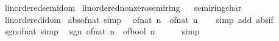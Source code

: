 \begin{isabellebody}
\isanewline
\isanewline
{}\isamarkupfalse%
\ linordered{\isacharunderscore}{\kern0pt}semidom\isanewline
{}\isanewline
\isanewline
{}\isamarkupfalse%
\ linordered{\isacharunderscore}{\kern0pt}nonzero{\isacharunderscore}{\kern0pt}semiring%
\isadelimproof
\ %
\endisadelimproof
%
\isatagproof
\isacommand{{\isachardot}{\kern0pt}{\isachardot}{\kern0pt}}\isamarkupfalse%
%
\endisatagproof
{\isafoldproof}%
%
\isadelimproof
%
\endisadelimproof
\isanewline
\isanewline
{}\isamarkupfalse%
\ semiring{\isacharunderscore}{\kern0pt}char{\isacharunderscore}{\kern0pt}{}%
\isadelimproof
\ %
\endisadelimproof
%
\isatagproof
\isacommand{{\isachardot}{\kern0pt}{\isachardot}{\kern0pt}}\isamarkupfalse%
%
\endisatagproof
{\isafoldproof}%
%
\isadelimproof
%
\endisadelimproof
\isanewline
\isanewline
{}\isamarkupfalse%
\isanewline
\isanewline
{}\isamarkupfalse%
\ linordered{\isacharunderscore}{\kern0pt}idom\isanewline
{}\isanewline
\isanewline
{}\isamarkupfalse%
\ abs{\isacharunderscore}{\kern0pt}of{\isacharunderscore}{\kern0pt}nat\ {\isacharbrackleft}{\kern0pt}simp{\isacharbrackright}{\kern0pt}{\isacharcolon}{\kern0pt}\isanewline
\ \ {\isachardoublequoteopen}{\isasymbar}of{\isacharunderscore}{\kern0pt}nat\ n{\isasymbar}\ {\isacharequal}{\kern0pt}\ of{\isacharunderscore}{\kern0pt}nat\ n{\isachardoublequoteclose}\isanewline
%
\isadelimproof
\ \ %
\endisadelimproof
%
\isatagproof
{}\isamarkupfalse%
\ {\isacharparenleft}{\kern0pt}simp\ add{\isacharcolon}{\kern0pt}\ abs{\isacharunderscore}{\kern0pt}if{\isacharparenright}{\kern0pt}%
\endisatagproof
{\isafoldproof}%
%
\isadelimproof
\isanewline
%
\endisadelimproof
\isanewline
{}\isamarkupfalse%
\ sgn{\isacharunderscore}{\kern0pt}of{\isacharunderscore}{\kern0pt}nat\ {\isacharbrackleft}{\kern0pt}simp{\isacharbrackright}{\kern0pt}{\isacharcolon}{\kern0pt}\isanewline
\ \ {\isachardoublequoteopen}sgn\ {\isacharparenleft}{\kern0pt}of{\isacharunderscore}{\kern0pt}nat\ n{\isacharparenright}{\kern0pt}\ {\isacharequal}{\kern0pt}\ of{\isacharunderscore}{\kern0pt}bool\ {\isacharparenleft}{\kern0pt}n\ {\isachargreater}{\kern0pt}\ {}{\isacharparenright}{\kern0pt}{\isachardoublequoteclose}\isanewline
%
\isadelimproof
\ \ %
\endisadelimproof
%
\isatagproof
{}\isamarkupfalse%
\ simp%
\endisatagproof
{\isafoldproof}%
%
\isadelimproof
\isanewline
%
\endisadelimproof
\isanewline
{}\isamarkupfalse%
\isanewline
\isanewline
{}\isamarkupfalse%

\end{isabellebody}
